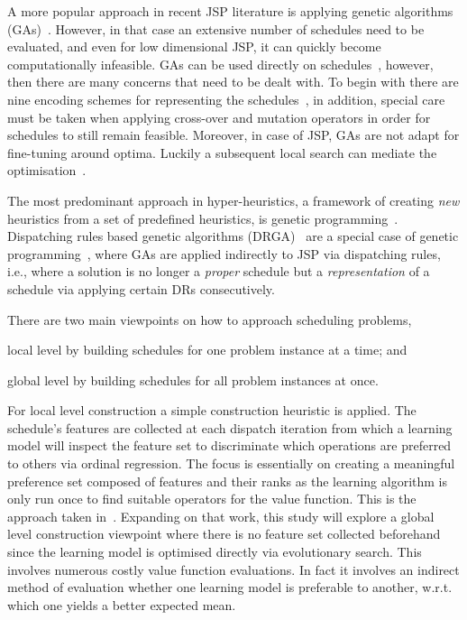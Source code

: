 \documentclass[a4paper,twoside]{article}
\begin{document}
A more popular approach in recent JSP literature is applying genetic algorithms (GAs)~\cite{Pinedo08}. However, in that case an extensive number of schedules need to be evaluated, and even for low dimensional JSP, it can quickly become computationally infeasible.
GAs can be used directly on schedules~\cite{Cheng96,Cheng99,Tsai07,Qing-dao-er-ji12,Ak12}, however, then there are many concerns that need to be dealt with. To begin with there are nine encoding schemes for representing the schedules~\cite{Cheng96}, in addition, special care must be taken when applying cross-over and mutation operators in order for schedules to still remain feasible. Moreover, in case of JSP, GAs are not adapt for fine-tuning around optima. Luckily a subsequent local search can mediate the optimisation~\cite{Cheng99}.

The most predominant approach in hyper-heuristics, a framework of creating \emph{new} heuristics from a set of  predefined heuristics, is genetic programming~\cite{Burke10}. 
Dispatching rules based genetic algorithms (DRGA)~\cite{Vazquez-Rodriguez09,Dhingra10,Nguyen13} are a special case of genetic programming~\cite{Koza05}, where GAs are applied indirectly to JSP via dispatching rules, i.e., where a solution is no longer a \emph{proper} schedule but a \emph{representation} of a schedule via applying certain DRs consecutively. 

There are two main viewpoints on how to approach scheduling problems,
\begin{inparaenum} 
\item local level by building schedules for one problem instance at a time;
and \item global level by building schedules for all problem instances at once.
\end{inparaenum}
For local level construction a simple construction heuristic is applied. The schedule's features are collected at each dispatch iteration from which a learning model will inspect the feature set to discriminate which operations are preferred to others via ordinal regression. The focus is essentially on creating a meaningful preference set composed of features and their ranks as the learning algorithm is only run once to find suitable operators for the value function. This is the approach taken in~\cite{InRu11a}. Expanding on that  work, this study will explore a global level construction viewpoint where there is no feature set collected beforehand since the learning model is optimised directly via evolutionary search. This involves numerous costly value function evaluations. In fact it involves an indirect method of evaluation whether one learning model is preferable to another, w.r.t. which one yields a better expected mean. 
\end{document}
